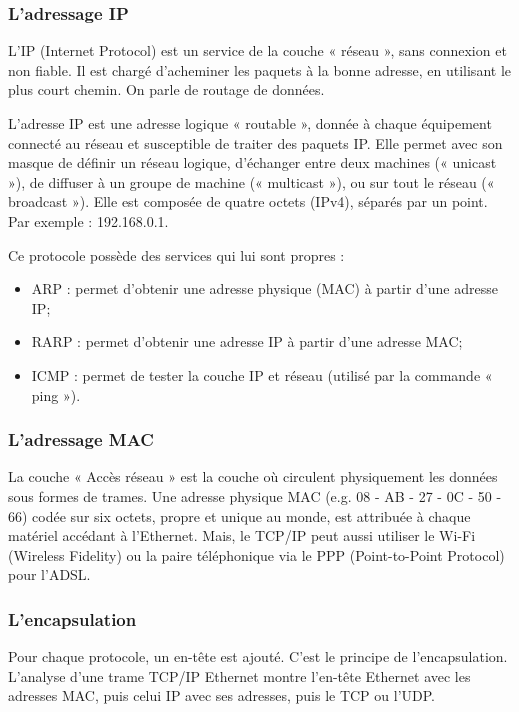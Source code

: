 \documentclass[10pt]{article}
\begin{document}
\subsubsection*{L’adressage IP}

L’IP (Internet Protocol) est un service de la couche « réseau », sans connexion et non fiable. Il est chargé d’acheminer les paquets à la bonne adresse, en utilisant le plus court chemin. On parle de routage de données.

L’adresse IP est une adresse logique « routable », donnée à chaque équipement connecté au réseau et susceptible de traiter des paquets IP. Elle permet avec son masque de définir un réseau logique, d’échanger entre deux machines (« unicast »), de diffuser à un groupe de machine (« multicast »), ou sur tout le réseau (« broadcast »).
Elle est composée de quatre octets (IPv4), séparés par un point. Par exemple : 192.168.0.1.

Ce protocole possède des services qui lui sont propres : 
\begin{itemize}
\item ARP : permet d’obtenir une adresse physique (MAC) à partir d’une adresse IP;
\item RARP : permet d’obtenir une adresse IP à partir d’une adresse MAC;
\item ICMP : permet de tester la couche IP et réseau (utilisé par la commande « ping »).
\end{itemize}

\subsubsection*{L’adressage MAC}
La couche « Accès réseau » est la couche où circulent physiquement les données sous formes de trames. Une adresse physique MAC (e.g. 08 - AB - 27 - 0C - 50 - 66) codée sur six octets, propre et unique au monde, est attribuée à chaque matériel accédant à l’Ethernet. Mais, le TCP/IP peut aussi utiliser le Wi-Fi (Wireless Fidelity) ou la paire téléphonique via le PPP (Point-to-Point Protocol) pour l’ADSL.

\subsubsection*{L’encapsulation}
Pour chaque protocole, un en-tête est ajouté. C’est le principe de l’encapsulation.
L’analyse d’une trame TCP/IP Ethernet montre l’en-tête Ethernet avec les adresses MAC, puis celui IP avec ses adresses, puis le TCP ou l’UDP.
\end{document}

